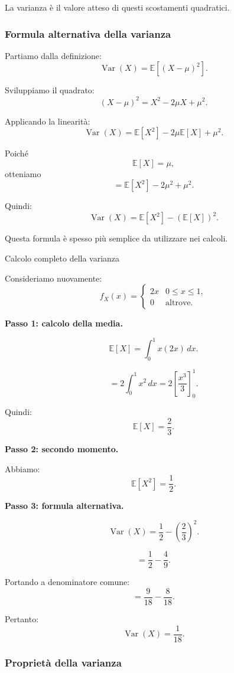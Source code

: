 La varianza è il valore atteso
di questi scostamenti quadratici.

\subsubsection{Formula alternativa della varianza}

Partiamo dalla definizione:
\[
\operatorname{Var}(X)
=
\mathbb{E}[(X-\mu)^2].
\]

Sviluppiamo il quadrato:
\[
(X-\mu)^2
=
X^2-2\mu X+\mu^2.
\]

Applicando la linearità:
\[
\operatorname{Var}(X)
=
\mathbb{E}[X^2]
-2\mu\mathbb{E}[X]
+\mu^2.
\]

Poiché
\[
\mathbb{E}[X]=\mu,
\]
otteniamo
\[
=
\mathbb{E}[X^2]-2\mu^2+\mu^2.
\]

Quindi:
\[
\boxed{
\operatorname{Var}(X)
=
\mathbb{E}[X^2]
-
(\mathbb{E}[X])^2.
}
\]

Questa formula è spesso
più semplice da utilizzare
nei calcoli.

\begin{example}{Calcolo completo della varianza}

Consideriamo nuovamente:
\[
f_X(x)=
\begin{cases}
2x & 0\leq x\leq1,\\
0 & \text{altrove}.
\end{cases}
\]

\textbf{Passo 1: calcolo della media.}

\[
\mathbb{E}[X]
=
\int_0^1 x(2x)\,dx.
\]

\[
=
2\int_0^1 x^2\,dx
=
2\left[\frac{x^3}{3}\right]_0^1.
\]

Quindi:
\[
\mathbb{E}[X]=\frac23.
\]

\textbf{Passo 2: secondo momento.}

Abbiamo:
\[
\mathbb{E}[X^2]=\frac12.
\]

\textbf{Passo 3: formula alternativa.}

\[
\operatorname{Var}(X)
=
\frac12-\left(\frac23\right)^2.
\]

\[
=
\frac12-\frac49.
\]

Portando a denominatore comune:
\[
=
\frac9{18}-\frac8{18}.
\]

Pertanto:
\[
\boxed{
\operatorname{Var}(X)=\frac1{18}.
}
\]
\end{example}

\subsubsection{Proprietà della varianza}

